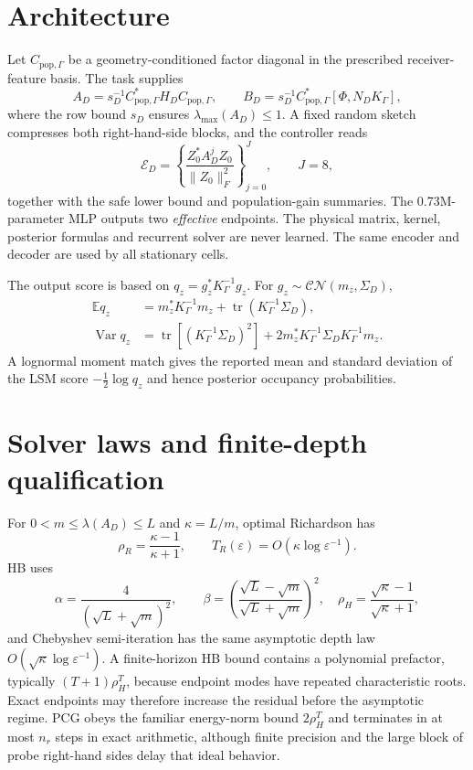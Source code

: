 \documentclass[10pt]{article}
\DeclareMathOperator{\tr}{tr}
\begin{document}
\section{Architecture}
Let $C_{\mathrm{pop},\Gamma}$ be a geometry-conditioned factor diagonal in
the prescribed receiver-feature basis.  The task supplies
\[
 A_D=s_D^{-1}C_{\mathrm{pop},\Gamma}^*H_D
 C_{\mathrm{pop},\Gamma},\qquad
 B_D=s_D^{-1}C_{\mathrm{pop},\Gamma}^*
 [\Phi,N_DK_\Gamma],
\]
where the row bound $s_D$ ensures $\lambda_{\max}(A_D)\leq1$.  A fixed random
sketch compresses both right-hand-side blocks, and the controller reads
\[
 \mathcal E_D=\left\{\frac{Z_0^*A_D^jZ_0}{\|Z_0\|_F^2}\right\}_{j=0}^J,
 \qquad J=8,
\]
together with the safe lower bound and population-gain summaries.  The 0.73M-
parameter MLP outputs two \emph{effective} endpoints.  The physical matrix,
kernel, posterior formulas and recurrent solver are never learned.  The same
encoder and decoder are used by all stationary cells.

The output score is based on $q_z=g_z^*K_\Gamma^{-1}g_z$.  For
$g_z\sim\mathcal{CN}(m_z,\Sigma_D)$,
\begin{align*}
 \mathbb E q_z&=m_z^*K_\Gamma^{-1}m_z+
 \tr(K_\Gamma^{-1}\Sigma_D),\\
 \operatorname{Var}q_z&=\tr[(K_\Gamma^{-1}\Sigma_D)^2]
 +2m_z^*K_\Gamma^{-1}\Sigma_DK_\Gamma^{-1}m_z.
\end{align*}
A lognormal moment match gives the reported mean and standard deviation of the
LSM score $-\tfrac12\log q_z$ and hence posterior occupancy probabilities.

\section{Solver laws and finite-depth qualification}
For $0<m\leq\lambda(A_D)\leq L$ and $\kappa=L/m$, optimal Richardson has
\[
 \rho_R=\frac{\kappa-1}{\kappa+1},\qquad
 T_R(\varepsilon)=O\!\left(\kappa\log\varepsilon^{-1}\right).
\]
HB uses
\[
 \alpha=\frac{4}{(\sqrt L+\sqrt m)^2},\qquad
 \beta=\left(\frac{\sqrt L-\sqrt m}{\sqrt L+\sqrt m}\right)^2,
\quad
 \rho_H=\frac{\sqrt\kappa-1}{\sqrt\kappa+1},
\]
and Chebyshev semi-iteration has the same asymptotic depth law
$O(\sqrt\kappa\log\varepsilon^{-1})$.  A finite-horizon HB bound contains a
polynomial prefactor, typically $(T+1)\rho_H^T$, because endpoint modes have
repeated characteristic roots.  Exact endpoints may therefore increase the
residual before the asymptotic regime.  PCG obeys the familiar energy-norm
bound $2\rho_H^T$ and terminates in at most $n_r$ steps in exact arithmetic,
although finite precision and the large block of probe right-hand sides delay
that ideal behavior.
\end{document}

